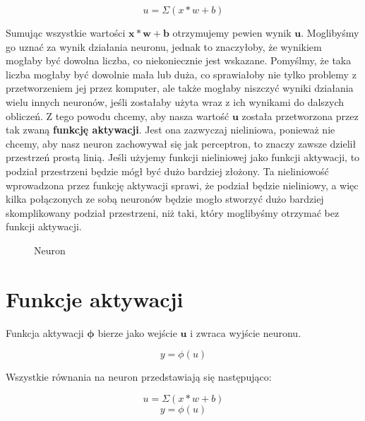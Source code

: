 \begin{equation}
u = \Sigma(x * w + b)
\end{equation}

Sumując wszystkie wartości $\boldsymbol{x * w + b}$ otrzymujemy pewien wynik $\boldsymbol{u}$. Moglibyśmy go uznać za wynik działania neuronu, jednak to znaczyłoby, że wynikiem mogłaby być dowolna liczba, co niekoniecznie jest wskazane. Pomyślmy, że taka liczba mogłaby być dowolnie mała lub duża, co sprawiałoby nie tylko problemy z przetworzeniem jej przez komputer, ale także mogłaby niszczyć wyniki działania wielu innych neuronów, jeśli zostałaby użyta wraz z ich wynikami do dalszych obliczeń. Z tego powodu chcemy, aby nasza wartość $\boldsymbol{u}$  została przetworzona przez tak zwaną \textbf{funkcję aktywacji}. Jest ona zazwyczaj nieliniowa, ponieważ nie chcemy, aby nasz neuron zachowywał się jak perceptron, to znaczy zawsze dzielił przestrzeń prostą linią. Jeśli użyjemy funkcji nieliniowej jako funkcji aktywacji, to podział przestrzeni będzie mógł być dużo bardziej złożony. Ta nieliniowość wprowadzona przez funkcję aktywacji sprawi, że podział będzie nieliniowy, a więc kilka połączonych ze sobą neuronów będzie mogło stworzyć dużo bardziej skomplikowany podział przestrzeni, niż taki, który moglibyśmy otrzymać bez funkcji aktywacji.\newline

\clearpage
\begin{figure}[H]
\centering

\caption{Neuron}
\end{figure}
\clearpage


\section{Funkcje aktywacji}

\noindent Funkcja aktywacji $\boldsymbol{\phi}$ bierze jako wejście $\boldsymbol{u}$ i zwraca wyjście neuronu.

\begin{equation}
y = \phi(u)
\end{equation}

\noindent Wszystkie równania na neuron przedstawiają się następująco:

\begin{equation}
u = \Sigma(x * w + b)
\end{equation}
\begin{equation}
y = \phi(u)
\end{equation}

